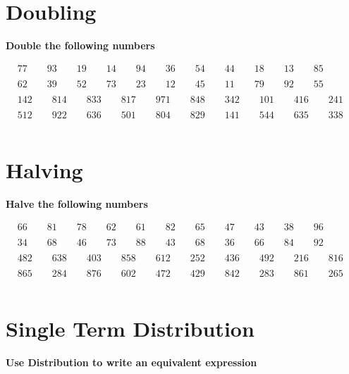 \documentclass{article}
\begin{document}
\section{Doubling}
\textbf{Double the following numbers}

\bigskip

\(\begin{aligned}
	&77 \qquad 93 \qquad 19 \qquad 14 \qquad 94 \qquad 36 \qquad 54 \qquad 44 \qquad 18 \qquad 13 \qquad 85 \\\\
	&62 \qquad 39 \qquad 52 \qquad 73 \qquad 23 \qquad 12 \qquad 45 \qquad 11 \qquad 79 \qquad 92 \qquad 55 \\\\
	&142 \qquad 814 \qquad 833 \qquad 817 \qquad 971 \qquad 848 \qquad 342 \qquad 101 \qquad 416 \qquad 241 \\\\
	&512 \qquad 922 \qquad 636 \qquad 501 \qquad 804 \qquad 829 \qquad 141 \qquad 544 \qquad 635 \qquad 338 \\\\
\end{aligned}\)

\section{Halving}
\textbf{Halve the following numbers}

\bigskip

\(\begin{aligned}
	&66 \qquad 81 \qquad 78 \qquad 62 \qquad 61 \qquad 82 \qquad 65 \qquad 47 \qquad 43 \qquad 38 \qquad 96 \\\\
	&34 \qquad 68 \qquad 46 \qquad 73 \qquad 88 \qquad 43 \qquad 68 \qquad 36 \qquad 66 \qquad 84 \qquad 92 \\\\
	&482 \qquad 638 \qquad 403 \qquad 858 \qquad 612 \qquad 252 \qquad 436 \qquad 492 \qquad 216 \qquad 816 \\\\
	&865 \qquad 284 \qquad 876 \qquad 602 \qquad 472 \qquad 429 \qquad 842 \qquad 283 \qquad 861 \qquad 265 \\\\
\end{aligned}\)

\bigskip


\section{Single Term Distribution}
\textbf{Use Distribution to write an equivalent expression}
\end{document}
